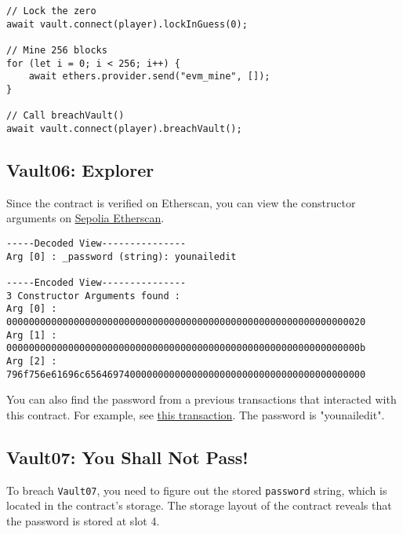 \documentclass[12pt]{article}
\begin{document}
\noindent
\begin{minipage}{\textwidth}
\begin{verbatim}
// Lock the zero
await vault.connect(player).lockInGuess(0);

// Mine 256 blocks
for (let i = 0; i < 256; i++) {
    await ethers.provider.send("evm_mine", []);
}

// Call breachVault()
await vault.connect(player).breachVault();
\end{verbatim}
\end{minipage}

\subsection*{Vault06: Explorer}
Since the contract is verified on Etherscan, you can view the constructor arguments on \href{https://sepolia.etherscan.io/address/0xA3a763bF62550511A0E485d6EB16c98937609A32\#code}{Sepolia Etherscan}.

\begin{verbatim}
-----Decoded View---------------
Arg [0] : _password (string): younailedit

-----Encoded View---------------
3 Constructor Arguments found :
Arg [0] : 0000000000000000000000000000000000000000000000000000000000000020
Arg [1] : 000000000000000000000000000000000000000000000000000000000000000b
Arg [2] : 796f756e61696c65646974000000000000000000000000000000000000000000
\end{verbatim}

You can also find the password from a previous transactions that interacted with this contract. For example, see \href{https://sepolia.etherscan.io/inputdatadecoder?tx=0xc1f544372d0e732537a72f5e6fba05ad2ef2346695519416bedd8f37d2f17a57}{this transaction}. The password is "younailedit".

\subsection*{Vault07: You Shall Not Pass!}

To breach \texttt{Vault07}, you need to figure out the stored \texttt{password} string, which is located in the contract's storage. The storage layout of the contract reveals that the password is stored at slot 4.
\end{document}
